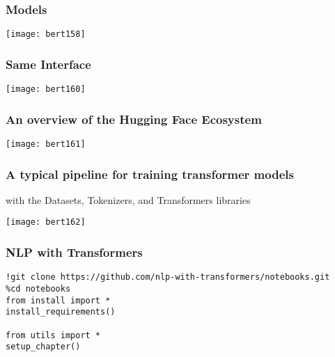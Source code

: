 \begin{frame}[fragile]\frametitle{Models}
			\begin{center}
			\texttt{[image: bert158]}
			\end{center}	
\end{frame}

\begin{frame}[fragile]\frametitle{Same Interface}
			\begin{center}
			\texttt{[image: bert160]}
			\end{center}	
\end{frame}

\begin{frame}[fragile]\frametitle{An overview of the Hugging Face Ecosystem}
			\begin{center}
			\texttt{[image: bert161]}
			\end{center}	
			
\end{frame}

\begin{frame}[fragile]\frametitle{A typical pipeline for training transformer models }

with the  Datasets,  Tokenizers, and  Transformers libraries

			\begin{center}
			\texttt{[image: bert162]}
			\end{center}	
			
\end{frame}

\begin{frame}[fragile]\frametitle{NLP with Transformers}

\begin{lstlisting}
!git clone https://github.com/nlp-with-transformers/notebooks.git
%cd notebooks
from install import *
install_requirements()

from utils import *
setup_chapter()
\end{lstlisting}
			
\end{frame}


